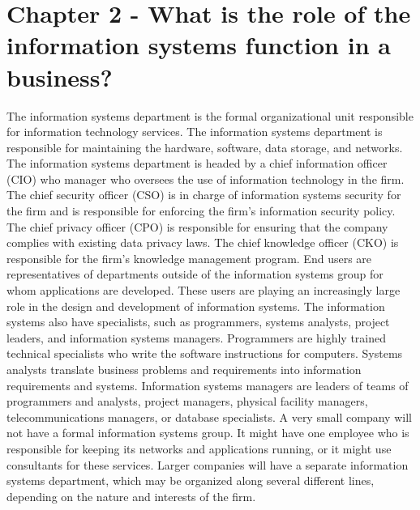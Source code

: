 \documentclass[12pt]{article}
\begin{document}
\section{Chapter 2 - What is the role of the information systems function in a business?}
The information systems department is the formal organizational unit responsible for information technology services. The information systems department is responsible for maintaining the hardware, software, data storage, and networks. The information systems department is headed by a chief information officer (CIO) who manager who oversees the use of information technology in the firm. The chief security officer (CSO) is in charge of information systems security for the firm and is responsible for enforcing the firm’s information security policy. The chief privacy officer (CPO) is responsible for ensuring that the company complies with existing data privacy laws. The chief knowledge officer (CKO) is responsible for the firm’s knowledge management program. End users are representatives of departments outside of the information systems group for whom applications are developed. These users are playing an increasingly large role in the design and development of information systems. 
The information systems also have specialists, such as programmers, systems analysts, project leaders, and information systems managers. Programmers are highly trained technical specialists who write the software instructions for computers. Systems analysts translate business problems and requirements into information requirements and systems. Information systems managers are leaders of teams of programmers and analysts, project managers, physical facility managers, telecommunications managers, or database specialists. A very small company will not have a formal information systems group. It might have one employee who is responsible for keeping its networks and applications running, or it might use consultants for these services. Larger companies will have a separate information systems department, which may be organized along several different lines, depending on the nature and interests of the firm. 
\end{document}
